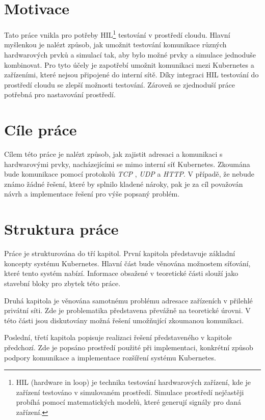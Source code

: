 \newpage

\section{Motivace}
Tato práce vnikla pro potřeby HIL\footnote{HIL (hardware in loop) je technika testování hardwarových zařízení, kde je zařízení testováno v simulovaném prostředí. Simulace prostředí nejčastěji probíhá pomocí matematických modelů, které generují signály pro daná zařízení.} testování v prostředí cloudu. Hlavní myšlenkou je nalézt způsob, jak umožnit testování komunikace různých hardwarových prvků a simulací tak, aby bylo možné prvky a simulace jednoduše kombinovat. Pro tyto účely je zapotřebí umožnit komunikaci mezi Kubernetes a zařízeními, které nejsou připojené do interní sítě. Díky integraci HIL testování do prostředí cloudu se zlepší možnosti testování. Zároveň se zjednoduší práce potřebná pro nastavování prostředí.

\section{Cíle práce}
Cílem této práce je nalézt způsob, jak zajistit adresaci a komunikaci s hardwarovými prvky, nacházejícími se mimo interní síť Kubernetes. Zkoumána bude komunikace pomocí protokolů \textit{TCP} , \textit{UDP} a \textit{HTTP}. V případě, že nebude známo žádné řešení, které by splnilo kladené nároky, pak je za cíl považován návrh a implementace řešení pro výše popsaný problém.

\section{Struktura práce}
Práce je strukturována do tří kapitol. První kapitola představuje základní koncepty systému Kubernetes. Hlavní část bude věnována možnostem síťování, které tento systém nabízí. Informace obsažené v teoretické části slouží jako stavební bloky pro zbytek této práce.

Druhá kapitola je věnována samotnému problému adresace zařízeních v přilehlé privátní síti. Zde je problematika představena převážně na teoretické úrovni. V této části jsou diskutovány možná řešení umožňující zkoumanou komunikaci.

Poslední, třetí kapitola popisuje realizaci řešení představeného v kapitole předchozí. Zde je popsáno prostředí použité při implementaci, konkrétní způsob podpory komunikace a implementace rozšíření systému Kubernetes.

